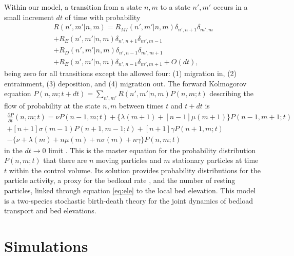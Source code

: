 \documentclass[draft]{agujournal2018}
\begin{document}
Within our model, a transition from a state $n,m$ to a state $n',m'$ occurs in a small increment $dt$ of time with probability
\begin{multline}
R(n',m'|n,m) = R_{MI}(n',m'| n, m)\delta_{n',n+1}\delta_{m',m} \\ + R_E(n',m'|n,m)\delta_{n',n+1}\delta_{m',m-1} \\+ R_D(n',m'|n,m)\delta_{n',n-1}\delta_{m',m+1}\\ + R_E(n',m'|n,m)\delta_{n',n-1}\delta_{m',m+1}  + O(dt), 
\end{multline}
being zero for all transitions except the allowed four: (1) migration in, (2) entrainment, (3) deposition, and (4) migration out.
The forward Kolmogorov equation $P(n,m; t+dt) = \sum_{n',m'}R(n',m'|n,m)P(n,m; t)$ describing the flow of probability at the state $n,m$ between times $t$ and $t+dt$ is
\begin{multline}
 \frac{\partial P}{\partial t}(n,m;t) =  
\nu P(n-1,m;t) + 
\{\lambda(m+1) + [n-1]\mu(m+1)\}P(n-1,m+1;t)\\ + 
[n+1]\sigma(m-1)P(n+1,m-1;t) + 
[n+1]\gamma P(n+1,m;t) \\- 
\{ \nu + \lambda(m) + n\mu(m) + n\sigma(m) + n \gamma \}P(n,m;t)
 \label{eq:master}
\end{multline} 
in the $dt \rightarrow 0$ limit \citep{Cox1965,Gillespie1992}.
This is the master equation for the probability distribution $P(n,m;t)$ that there are $n$ moving particles and $m$ stationary particles at time $t$ within the control volume. 
Its solution provides probability distributions for the particle activity, a proxy for the bedload rate \citep[e.g.][]{Ancey2008, Furbish2012}, and the number of resting particles, linked through equation \ref{eq:ele} to the local bed elevation.
This model is a two-species stochastic birth-death theory \citep[e.g.][]{Pielou1977} for the joint dynamics of bedload transport and bed elevations.

\section{Simulations}
\end{document}

